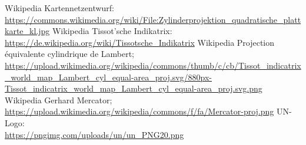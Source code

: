 \begin{thebibliography}{99}
 Wikipedia \glqq Kartennetzentwurf\grqq:\\
    \url{https://commons.wikimedia.org/wiki/File:Zylinderprojektion_quadratische_plattkarte_kl.jpg}
 Wikipedia \glqq Tissot'sche Indikatrix\grqq:\\ 
       \url{https://de.wikipedia.org/wiki/Tissotsche_Indikatrix}
 Wikipedia \glqq Projection \'{e}quivalente cylindrique de Lambert\grqq;\\ 
    \url{https://upload.wikimedia.org/wikipedia/commons/thumb/c/cb/Tissot_indicatrix_world_map_Lambert_cyl_equal-area_proj.svg/880px-Tissot_indicatrix_world_map_Lambert_cyl_equal-area_proj.svg.png}
 Wikipedia \glqq Gerhard Mercator\grqq;\\ 
        \url{https://upload.wikimedia.org/wikipedia/commons/f/fa/Mercator-proj.png}
 UN-Logo:\\
            \url{https://pngimg.com/uploads/un/un_PNG20.png}

\end{thebibliography}

%

